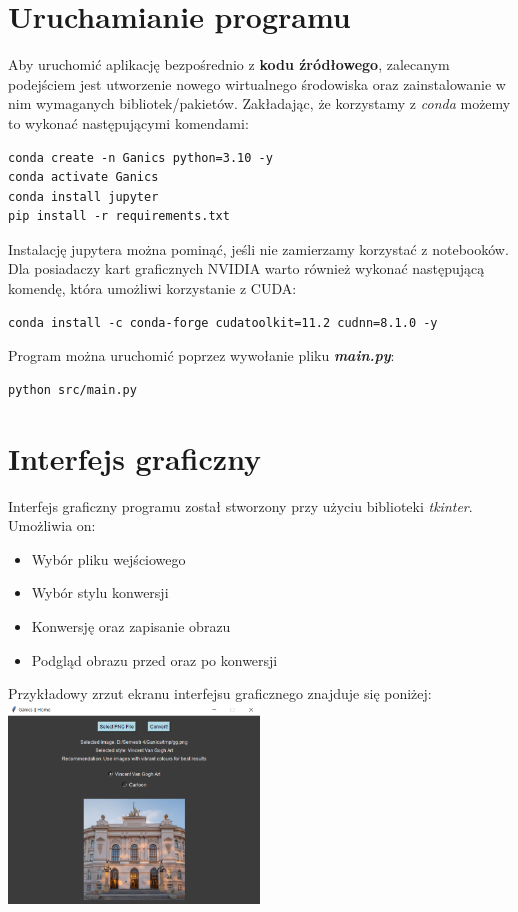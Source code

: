 \documentclass{article}
\begin{document}
\section{Uruchamianie programu}
Aby uruchomić aplikację bezpośrednio z \textbf{kodu źródłowego}, zalecanym podejściem jest utworzenie nowego wirtualnego środowiska oraz zainstalowanie w nim wymaganych bibliotek/pakietów.
Zakładając, że korzystamy z \textit{conda} możemy to wykonać następującymi komendami:
\begin{verbatim}
conda create -n Ganics python=3.10 -y
conda activate Ganics
conda install jupyter
pip install -r requirements.txt
\end{verbatim}
Instalację jupytera można pominąć, jeśli nie zamierzamy korzystać z notebooków.
\vspace{3mm} \\
Dla posiadaczy kart graficznych NVIDIA warto również wykonać następującą komendę, która umożliwi korzystanie z CUDA:
\begin{verbatim}
conda install -c conda-forge cudatoolkit=11.2 cudnn=8.1.0 -y
\end{verbatim}
Program można uruchomić poprzez wywołanie pliku \textbf{\textit{main.py}}:
\begin{verbatim}
python src/main.py
\end{verbatim}

\section{Interfejs graficzny}
Interfejs graficzny programu został stworzony przy użyciu biblioteki \textit{tkinter}. Umożliwia on:
\begin{itemize}
    \setlength\itemsep{0pt}
    \item Wybór pliku wejściowego
    \item Wybór stylu konwersji
    \item Konwersję oraz zapisanie obrazu
    \item Podgląd obrazu przed oraz po konwersji
\end{itemize}
Przykładowy zrzut ekranu interfejsu graficznego znajduje się poniżej:
\vspace{3mm} \\
\includegraphics[width=0.5\textwidth]{../imgs/gui.png}
\end{document}
